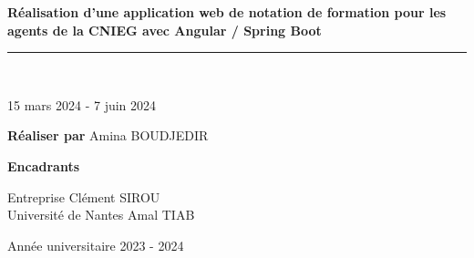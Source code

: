 \documentclass[a4paper,12pt]{report}
\begin{document}
\begin{titlepage}
\begin{center}
  \textbf {Réalisation d’une application web de notation de formation pour les agents de la CNIEG avec Angular / Spring Boot }

  \vspace{0,1cm}
  \rule{\textwidth}{0.8pt} \\ %
  
  \vspace{1cm}
  
  {\Large 15 mars 2024 - 7 juin 2024 \par}
  \vfill
\end{center}

\noindent
\hspace{2cm}\textbf{Réaliser par } \hspace{1cm} Amina BOUDJEDIR

\vspace{1.5cm}

\noindent
\hspace{2cm}\textbf{Encadrants} \\
\begin{tabbing}
  \hspace{4cm} Entreprise \hspace{2,9cm} Clément SIROU \\
  \hspace{4cm} Université de Nantes \hspace{1cm} Amal TIAB
\end{tabbing}
\vfill

\begin{center}
    Année universitaire 2023 - 2024
\end{center}

  
\end{titlepage}




\tableofcontents
\newpage







\listoffigures

\nocite{*}





\end{document}
